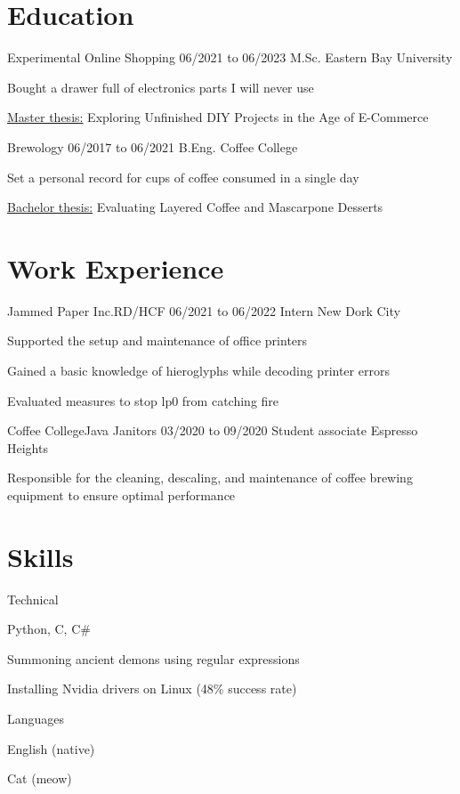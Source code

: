 \section{Education}
\begin{resumeList}	{Experimental Online Shopping}{}	{06/2021 to 06/2023}
					{M.Sc.}								{Eastern Bay University}
	\item Bought a drawer full of electronics parts I will never use
	\item \underline{Master thesis:} Exploring Unfinished DIY Projects in the Age of E-Commerce
\end{resumeList}
\begin{resumeList}	{Brewology}{}	{06/2017 to 06/2021}
					{B.Eng.}		{Coffee College}
	\item Set a personal record for cups of coffee consumed in a single day
	\item \underline{Bachelor thesis:} Evaluating Layered Coffee and Mascarpone Desserts
\end{resumeList}


\section{Work Experience}
\begin{resumeList}	{Jammed Paper Inc.}{RD/HCF}	{06/2021 to 06/2022}
					{Intern}	{New Dork City}
	\item Supported the setup and maintenance of office printers
	\item Gained a basic knowledge of hieroglyphs while decoding printer errors
	\item Evaluated measures to stop lp0 from catching fire
\end{resumeList}
\begin{resumeList}	{Coffee College}{Java Janitors}	{03/2020 to 09/2020}
					{Student associate}					{Espresso Heights}
	\item Responsible for the cleaning, descaling, and maintenance of coffee brewing equipment to ensure optimal performance
\end{resumeList}


\section{Skills}
\begin{resumeList}{Technical}{}{}{}{}
	\item Python, C, C\#
	\item Summoning ancient demons using regular expressions
	\item Installing Nvidia drivers on Linux (48\% success rate)
\end{resumeList}

\begin{resumeList}{Languages}{}{}{}{}
	\item English (native)
	\item Cat (meow)
\end{resumeList}
